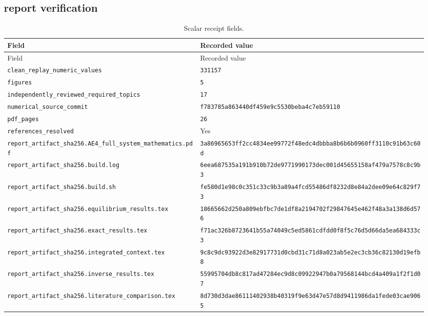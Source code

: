 \subsection*{report verification}

\begingroup\scriptsize
\setlength{\tabcolsep}{3pt}
\begin{longtable}{p{.46\linewidth}p{.46\linewidth}}
\caption{Scalar receipt fields.}\\
\toprule
Field & Recorded value \\
\midrule\endfirsthead
\toprule
Field & Recorded value \\
\midrule\endhead
\bottomrule\endfoot
\nolinkurl{clean_replay_numeric_values} & \texttt{331157} \\
\nolinkurl{figures} & \texttt{5} \\
\nolinkurl{independently_reviewed_required_topics} & \texttt{17} \\
\nolinkurl{numerical_source_commit} & \nolinkurl{f783785a863440df459e9c5530beba4c7eb59110} \\
\nolinkurl{pdf_pages} & \texttt{26} \\
\nolinkurl{references_resolved} & Yes \\
\nolinkurl{report_artifact_sha256.AE4_full_system_mathematics.pdf} & \nolinkurl{3a86965653ff2cc4834ee99772f48edc4dbbba8b6b6b0960ff3110c91b63c60d} \\
\nolinkurl{report_artifact_sha256.build.log} & \nolinkurl{6eea687535a191b910b72de9771990173dec001d45655158af479a7578c8c9b3} \\
\nolinkurl{report_artifact_sha256.build.sh} & \nolinkurl{fe580d1e98c0c351c33c9b3a89a4fcd55486df8232d8e84a2dee09e64c829f73} \\
\nolinkurl{report_artifact_sha256.equilibrium_results.tex} & \nolinkurl{18665662d250a809ebfbc7de1df8a2194702f29847645e462f48a3a138d6d576} \\
\nolinkurl{report_artifact_sha256.exact_results.tex} & \nolinkurl{f71ac326b8723641b55a74049c5ed5861cdfdd0f8f5c76d5d66da5ea684333c3} \\
\nolinkurl{report_artifact_sha256.integrated_context.tex} & \nolinkurl{9c8c9dc93922d3e82917731d0cbd31c71d8a023ab5e2ec3cb36c82130d19efb8} \\
\nolinkurl{report_artifact_sha256.inverse_results.tex} & \nolinkurl{55995704db8c817ad47284ec9d8c09922947b0a79568144bcd4a409a1f2f1d07} \\
\nolinkurl{report_artifact_sha256.literature_comparison.tex} & \nolinkurl{8d730d3dae86111402938b40319f9e63d47e57d8d9411986da1fede03cae9065} \\

\end{longtable}
